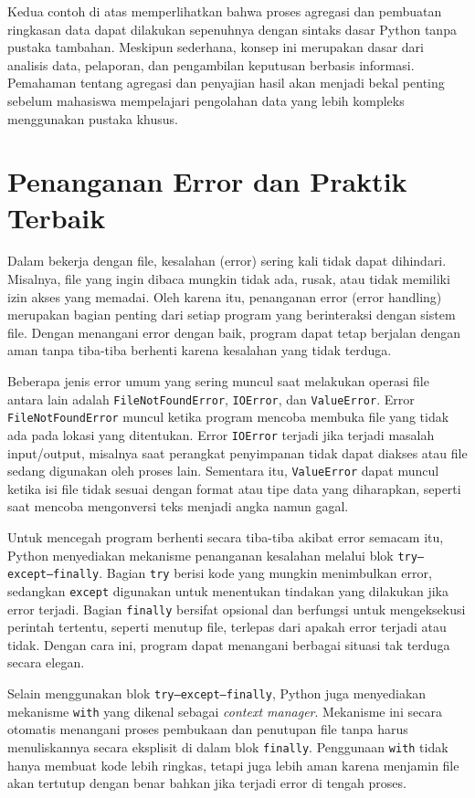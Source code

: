 Kedua contoh di atas memperlihatkan bahwa proses agregasi dan pembuatan ringkasan data dapat dilakukan sepenuhnya dengan sintaks dasar Python tanpa pustaka tambahan. Meskipun sederhana, konsep ini merupakan dasar dari analisis data, pelaporan, dan pengambilan keputusan berbasis informasi. Pemahaman tentang agregasi dan penyajian hasil akan menjadi bekal penting sebelum mahasiswa mempelajari pengolahan data yang lebih kompleks menggunakan pustaka khusus.


\section{Penanganan Error dan Praktik Terbaik}

Dalam bekerja dengan file, kesalahan (error) sering kali tidak dapat dihindari. Misalnya, file yang ingin dibaca mungkin tidak ada, rusak, atau tidak memiliki izin akses yang memadai. Oleh karena itu, penanganan error (error handling) merupakan bagian penting dari setiap program yang berinteraksi dengan sistem file. Dengan menangani error dengan baik, program dapat tetap berjalan dengan aman tanpa tiba-tiba berhenti karena kesalahan yang tidak terduga.

Beberapa jenis error umum yang sering muncul saat melakukan operasi file antara lain adalah \texttt{FileNotFoundError}, \texttt{IOError}, dan \texttt{ValueError}.  
Error \texttt{FileNotFoundError} muncul ketika program mencoba membuka file yang tidak ada pada lokasi yang ditentukan. Error \texttt{IOError} terjadi jika terjadi masalah input/output, misalnya saat perangkat penyimpanan tidak dapat diakses atau file sedang digunakan oleh proses lain. Sementara itu, \texttt{ValueError} dapat muncul ketika isi file tidak sesuai dengan format atau tipe data yang diharapkan, seperti saat mencoba mengonversi teks menjadi angka namun gagal.

Untuk mencegah program berhenti secara tiba-tiba akibat error semacam itu, Python menyediakan mekanisme penanganan kesalahan melalui blok \texttt{try--except--finally}.  
Bagian \texttt{try} berisi kode yang mungkin menimbulkan error, sedangkan \texttt{except} digunakan untuk menentukan tindakan yang dilakukan jika error terjadi.  
Bagian \texttt{finally} bersifat opsional dan berfungsi untuk mengeksekusi perintah tertentu, seperti menutup file, terlepas dari apakah error terjadi atau tidak.  
Dengan cara ini, program dapat menangani berbagai situasi tak terduga secara elegan.

Selain menggunakan blok \texttt{try--except--finally}, Python juga menyediakan mekanisme \texttt{with} yang dikenal sebagai \textit{context manager}.  
Mekanisme ini secara otomatis menangani proses pembukaan dan penutupan file tanpa harus menuliskannya secara eksplisit di dalam blok \texttt{finally}.  
Penggunaan \texttt{with} tidak hanya membuat kode lebih ringkas, tetapi juga lebih aman karena menjamin file akan tertutup dengan benar bahkan jika terjadi error di tengah proses.

